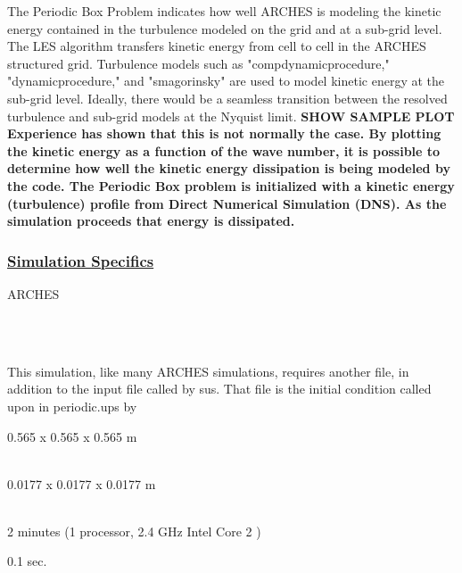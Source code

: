 The Periodic Box Problem indicates how well ARCHES is modeling the kinetic energy contained in the turbulence modeled on the grid and at a sub-grid level.  The LES algorithm transfers kinetic energy from cell to cell in the ARCHES structured grid. Turbulence models such as "compdynamicprocedure," "dynamicprocedure," and "smagorinsky" are used to model kinetic energy at the sub-grid level.  Ideally, there would be a seamless transition between the resolved turbulence and sub-grid models at the Nyquist limit.  \bf{SHOW SAMPLE PLOT}  Experience has shown that this is not normally the case.   By plotting the kinetic energy as a function of the wave number, it is possible to determine how well the kinetic energy dissipation is being modeled by the code.  The Periodic Box problem is initialized with a kinetic energy (turbulence) profile from Direct Numerical Simulation (DNS).  As the simulation proceeds that energy is dissipated.  

\subsubsection*{\underline{Simulation Specifics}}
\begin{description} 
\footnotesize
\item [Component used:] \hfill ARCHES
\item [Input file name:] \hfill {}\\
 
\item [Command used to run input file:]\hfill \\
This simulation, like many ARCHES simulations, requires another file, in addition to the input file called by sus.  That file is the initial condition called upon in periodic.ups by %


\item [Simulation Domain:]\hfill    0.565 x 0.565 x 0.565 m
\item [Cell Spacing:]\hfill \\ 
0.0177 x 0.0177 x 0.0177 m  %

\item [Example Runtimes:] \hfill \\
2 minutes   (1 processor, 2.4 GHz Intel Core 2 )

\item [Physical time simulated:] \hfill 0.1 sec.  %
\end{description}

